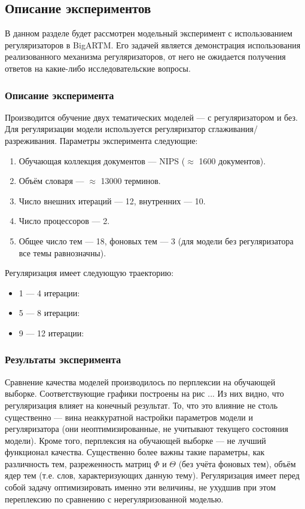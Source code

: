 
\subsection{Описание экспериментов}

В данном разделе будет рассмотрен модельный эксперимент с использованием регуляризаторов в BigARTM. Его задачей является демонстрация использования реализованного механизма регуляризаторов, от него не ожидается получения ответов на какие-либо исследовательские вопросы.

\subsubsection{Описание эксперимента} 
Производится обучение двух тематических моделей --- с регуляризатором и без. Для регуляризации модели используется регуляризатор сглаживания/разреживания. Параметры эксперимента следующие:

\begin{enumerate}
	\item Обучающая коллекция документов --- NIPS ($\approx$ 1600 документов).
	\item Объём словаря --- $\approx$ 13000 терминов.
	\item Число внешних итераций --- 12, внутренних --- 10.
	\item Число процессоров --- 2.
	\item Общее число тем --- 18, фоновых тем --- 3 (для модели без регуляризатора все темы равнозначны).
\end{enumerate} 

Регуляризация имеет следующую траекторию:
\begin{itemize}
	\item 1 --- 4 итерации: 
	\item 5 --- 8 итерации: 
	\item 9 --- 12 итерации:  
\end{itemize}

\subsubsection{Результаты эксперимента}

Сравнение качества моделей производилось по перплексии на обучающей выборке. Соответствующие графики построены на рис ... Из них видно, что регуляризация влияет на конечный результат. То, что это влияние не столь существенно --- вина неаккуратной настройки параметров модели и регуляризатора (они неоптимизированные, не учитывают текущего состояния модели). Кроме того, перплексия на обучающей выборке --- не лучший функционал качества. Существенно более важны такие параметры, как различность тем, разреженность матриц $\Phi$ и $\Theta$ (без учёта фоновых тем), объём ядер тем (т.е. слов, характеризующих данную тему). Регуляризация имеет перед собой задачу оптимизировать именно эти величины, не ухудшив при этом переплексию по сравнению с нерегуляризованной моделью.